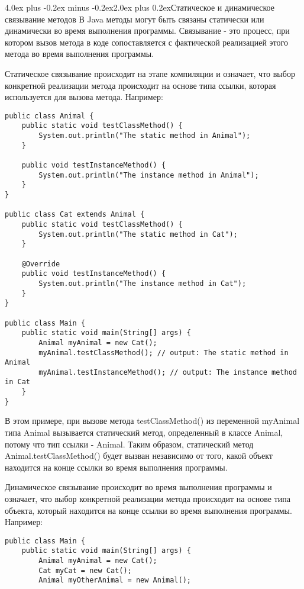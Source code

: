 \documentclass[12pt, a4paper]{book}%
\makeatletter
\renewcommand{\section}{\@startsection{section}{1}{1pt}%
{4.0ex plus -0.2ex minus -0.2ex}{2.0ex plus 0.2ex}{\centering\bf}}%
\makeatother
\begin{document}
{\section{Статическое и динамическое связывание методов}
В Java методы могут быть связаны статически или динамически во время выполнения программы. Связывание - это процесс, при котором вызов метода в коде сопоставляется с фактической реализацией этого метода во время выполнения программы.

Статическое связывание происходит на этапе компиляции и означает, что выбор конкретной реализации метода происходит на основе типа ссылки, которая используется для вызова метода. Например:

\begin{lstlisting}
public class Animal {
    public static void testClassMethod() {
        System.out.println("The static method in Animal");
    }

    public void testInstanceMethod() {
        System.out.println("The instance method in Animal");
    }
}

public class Cat extends Animal {
    public static void testClassMethod() {
        System.out.println("The static method in Cat");
    }

    @Override
    public void testInstanceMethod() {
        System.out.println("The instance method in Cat");
    }
}

public class Main {
    public static void main(String[] args) {
        Animal myAnimal = new Cat();
        myAnimal.testClassMethod(); // output: The static method in Animal
        myAnimal.testInstanceMethod(); // output: The instance method in Cat
    }
}

\end{lstlisting}

В этом примере, при вызове метода testClassMethod() из переменной myAnimal типа Animal вызывается статический метод, определенный в классе Animal, потому что тип ссылки - Animal. Таким образом, статический метод Animal.testClassMethod() будет вызван независимо от того, какой объект находится на конце ссылки во время выполнения программы.

Динамическое связывание происходит во время выполнения программы и означает, что выбор конкретной реализации метода происходит на основе типа объекта, который находится на конце ссылки во время выполнения программы. Например:

\begin{lstlisting}
public class Main {
    public static void main(String[] args) {
        Animal myAnimal = new Cat();
        Cat myCat = new Cat();
        Animal myOtherAnimal = new Animal();


\end{lstlisting}}
\end{document}

